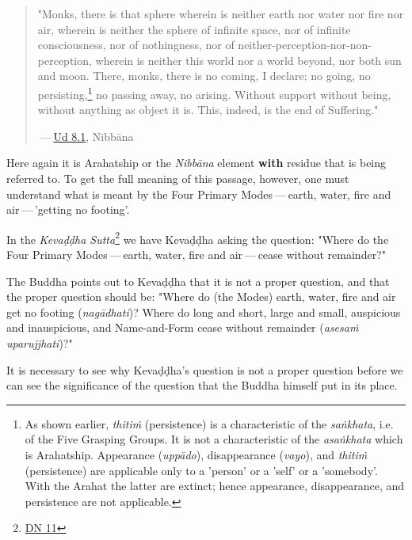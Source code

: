 \begin{quote}
"Monks, there is that sphere wherein is neither earth nor water nor fire nor air, wherein is neither the sphere of infinite space, nor of infinite consciousness, nor of nothingness, nor of neither-perception-nor-non-perception, wherein is neither this world nor a world beyond, nor both sun and moon. There, monks, there is no coming, I declare; no going, no persisting,\footnote{As shown earlier, \emph{thitiṁ} (persistence) is a characteristic of the \emph{saṅkhata}, i.e. of the Five Grasping Groups. It is not a characteristic of the \emph{asaṅkhata} which is Arahatship. Appearance (\emph{uppādo}), disappearance (\emph{vayo}), and \emph{thitiṁ} (persistence) are applicable only to a 'person' or a 'self' or a 'somebody'. With the Arahat the latter are extinct; hence appearance, disappearance, and persistence are not applicable.} no passing away, no arising. Without support without being, without anything as object it is. This, indeed, is the end of Suffering."

 --- \href{https://suttacentral.net/ud8.1/en/anandajoti}{Ud 8.1}, Nibbāna
\end{quote}

Here again it is Arahatship or the \emph{Nibbāna} element \textbf{with} residue that is being referred to. To get the full meaning of this passage, however, one must understand what is meant by the Four Primary Modes --- earth, water, fire and air --- 'getting no footing'.

In the \emph{Kevaḍḍha Sutta}\footnote{\href{https://suttacentral.net/dn11/en/sujato}{DN 11}} we have Kevaḍḍha asking the question: "Where do the Four Primary Modes --- earth, water, fire and air --- cease without remainder?"

The Buddha points out to Kevaḍḍha that it is not a proper question, and that the proper question should be: "Where do (the Modes) earth, water, fire and air get no footing (\emph{nagādhati})? Where do long and short, large and small, auspicious and inauspicious, and Name-and-Form cease without remainder (\emph{asesaṁ uparujjhati})?"

It is necessary to see why Kevaḍḍha's question is not a proper question before we can see the significance of the question that the Buddha himself put in its place.

